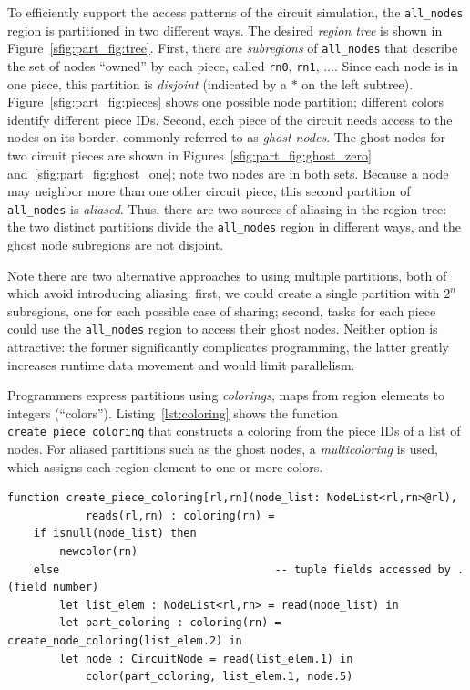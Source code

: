 To efficiently support the access patterns of the circuit simulation,
the {\tt all\_nodes} region is partitioned in two different ways.  The
desired {\em region tree} is shown in Figure~\ref{sfig:part_fig:tree}.
First, there are {\em subregions} of {\tt all\_nodes} that describe
the set of nodes ``owned'' by each piece, called {\tt rn0}, {\tt rn1},
$\ldots$. Since each node is in one piece, this partition is {\em
disjoint} (indicated by a $*$ on the left subtree).
Figure~\ref{sfig:part_fig:pieces} shows one possible node partition;
different colors identify different piece IDs.  Second, each piece of
the circuit needs access to the nodes on its border, commonly referred
to as {\em ghost nodes}.  The ghost nodes for two circuit pieces are
shown in Figures~\ref{sfig:part_fig:ghost_zero}
and~\ref{sfig:part_fig:ghost_one}; note two nodes are in both sets.
Because a node may neighbor more than one other circuit piece, this
second partition of {\tt all\_nodes} is {\em aliased}.  Thus, there
are two sources of aliasing in the region tree: the two distinct partitions
divide the {\tt all\_nodes} region in different ways, and the ghost
node subregions are not disjoint.

Note there are two alternative approaches to using multiple partitions,
both of which avoid introducing aliasing:
first, we could create a single partition with $2^n$ subregions, one for each
possible case of sharing; second, tasks for each piece could use the
{\tt all\_nodes} region to access their ghost nodes.  Neither option
is attractive: the former significantly complicates programming, the
latter greatly increases runtime data movement and would limit parallelism.

Programmers express partitions using {\em colorings},
maps from region elements to integers (``colors'').
Listing~\ref{lst:coloring} shows the function {\tt create\_piece\_coloring}
that constructs a coloring from the piece IDs of a list of nodes.
For aliased partitions such as the ghost nodes, a {\em multicoloring}
is used, which assigns each region element to one or more colors.  
\begin{lstlisting}[label={lst:coloring},caption={Coloring Construction}]
function create_piece_coloring[rl,rn](node_list: NodeList<rl,rn>@rl),
            reads(rl,rn) : coloring(rn) = 
    if isnull(node_list) then
        newcolor(rn) 
    else                                 -- tuple fields accessed by .(field number)
        let list_elem : NodeList<rl,rn> = read(node_list) in
        let part_coloring : coloring(rn) = create_node_coloring(list_elem.2) in
        let node : CircuitNode = read(list_elem.1) in
            color(part_coloring, list_elem.1, node.5)
\end{lstlisting}

